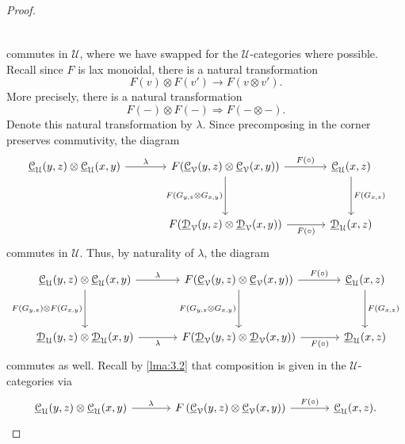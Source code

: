 \begin{proof}
\[\begin{tikzcd}[row sep = 3.5em, column sep = 3.5em]
	\end{tikzcd}\]
	commutes in $\mathcal{U} $, where we have swapped for the $\mathcal{U} $-categories where possible. Recall since $F$ is lax monoidal, there is a natural transformation
	\[
		F(v)\otimes F(v')\to F(v\otimes v')
	.\]
	More precisely, there is a natural transformation
	\[
		F(-)\otimes F(-)\Rightarrow F(-\otimes -)
	.\]
	Denote this natural transformation by $\lambda$. Since precomposing in the corner preserves commutivity, the diagram
	\[\begin{tikzcd}[row sep = 3.5em, column sep = 3.5em]
	\underline{\mathcal{C} } _\mathcal{U} (y,z)\otimes \underline{\mathcal{C} } _\mathcal{U} (x,y)\ar[" \lambda ", r] & F(\underline{\mathcal{C} } _\mathcal{V} (y,z)\otimes \underline{\mathcal{C} } _\mathcal{V} (x,y))\ar[" F(\circ ) ", r] \ar[" F(G_{y\text{,} z} \otimes G_{x\text{,} y} ) "', d]  & \underline{\mathcal{C} } _\mathcal{U} (x,z)\ar[" F(G_{x\text{,} z} ) ", d]  \\
	& F(\underline{\mathcal{D} } _\mathcal{V} (y,z)\otimes \underline{\mathcal{D} } _\mathcal{V} (x,y))\ar[" F(\circ ) "', r]  & \underline{\mathcal{D} } _\mathcal{U} (x,z)
	\end{tikzcd}\]
	commutes in $\mathcal{U} $. Thus, by naturality of $\lambda$, the diagram
	\[\begin{tikzcd}[row sep = 3.5em, column sep = 3.5em]
	\underline{\mathcal{C} } _\mathcal{U} (y,z)\otimes \underline{\mathcal{C} } _\mathcal{U} (x,y)\ar[" \lambda ", r] \ar[" F(G_{y\text{,} z} )\otimes F(G_{x\text{,} y} ) "', d] & F(\underline{\mathcal{C} } _\mathcal{V} (y,z)\otimes \underline{\mathcal{C} } _\mathcal{V} (x,y))\ar[" F(\circ ) ", r] \ar[" F(G_{y\text{,} z} \otimes G_{x\text{,} y} ) "', d]  & \underline{\mathcal{C} } _\mathcal{U} (x,z)\ar[" F(G_{x\text{,} z} ) ", d]  \\
	\underline{\mathcal{D} } _\mathcal{U} (y,z)\otimes \underline{\mathcal{D} } _\mathcal{U} (x,y)\ar[" \lambda "', r] & F(\underline{\mathcal{D} } _\mathcal{V} (y,z)\otimes \underline{\mathcal{D} } _\mathcal{V} (x,y))\ar[" F(\circ ) "', r]  & \underline{\mathcal{D} } _\mathcal{U} (x,z)
	\end{tikzcd}\]
	commutes as well. Recall by \cref{lma:3.2} that composition is given in the $\mathcal{U} $-categories via
	\[\begin{tikzcd}[row sep = 2.5em, column sep = 3.5em]
		\underline{\mathcal{C} } _\mathcal{U} (y,z)\otimes \underline{\mathcal{C} } _\mathcal{U} (x,y)\ar[" \lambda ", r] & F\left( \underline{\mathcal{C} } _\mathcal{V} (y,z)\otimes \underline{\mathcal{C} } _\mathcal{V} (x,y) \right) \ar[" F(\circ  )", r] & \underline{\mathcal{C} } _\mathcal{U} (x,z).

\end{tikzcd}\]
\end{proof}
